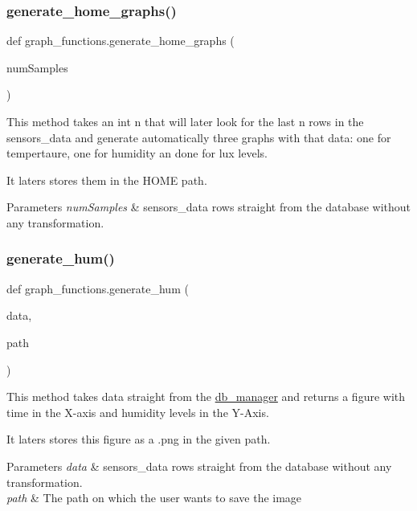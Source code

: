 \subsubsection{\texorpdfstring{generate\+\_\+home\+\_\+graphs()}{generate\_home\_graphs()}}
{\footnotesize\ttfamily def graph\+\_\+functions.\+generate\+\_\+home\+\_\+graphs (\begin{DoxyParamCaption}\item[{}]{num\+Samples }\end{DoxyParamCaption})}



This method takes an int \textquotesingle{}n\textquotesingle{} that will later look for the last \textquotesingle{}n\textquotesingle{} rows in the \textquotesingle{}sensors\+\_\+data\textquotesingle{} and generate automatically three graphs with that data\+: one for tempertaure, one for humidity an done for lux levels. 

It laters stores them in the H\+O\+ME path. 
\begin{DoxyParams}{Parameters}
{\em num\+Samples} & \textquotesingle{}sensors\+\_\+data\textquotesingle{} rows straight from the database without any transformation. \\
\hline
\end{DoxyParams}
\mbox{\label{namespacegraph__functions_a2dd7588fd40c25a37c8ef2989108a95d}} 
\subsubsection{\texorpdfstring{generate\+\_\+hum()}{generate\_hum()}}
{\footnotesize\ttfamily def graph\+\_\+functions.\+generate\+\_\+hum (\begin{DoxyParamCaption}\item[{}]{data,  }\item[{}]{path }\end{DoxyParamCaption})}



This method takes data straight from the \textquotesingle{}\hyperlink{namespacedb__manager}{db\+\_\+manager}\textquotesingle{} and returns a figure with time in the X-\/axis and humidity levels in the Y-\/\+Axis. 

It laters stores this figure as a .png in the given path. 
\begin{DoxyParams}{Parameters}
{\em data} & \textquotesingle{}sensors\+\_\+data\textquotesingle{} rows straight from the database without any transformation. \\
\hline
{\em path} & The path on which the user wants to save the image \\
\hline
\end{DoxyParams}
\mbox{\label{namespacegraph__functions_a543a2d6ea7c3aadf374c8ee6d4d0f363}} 
